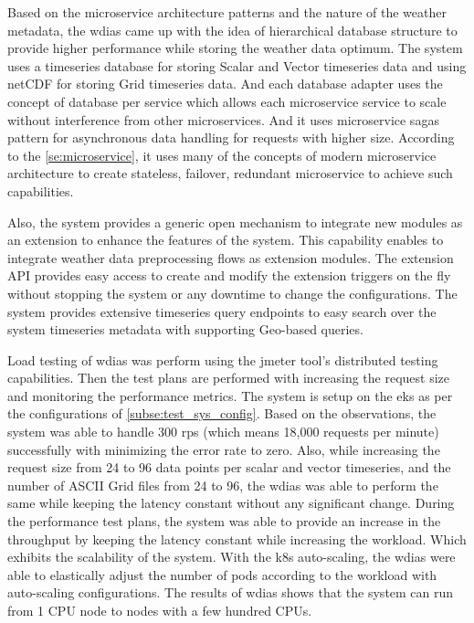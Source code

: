 Based on the microservice architecture patterns and the nature of the weather metadata, the \acrshort{wdias} came up with the idea of hierarchical database structure to provide higher performance while storing the weather data optimum. The system uses a timeseries database for storing Scalar and Vector timeseries data and using \acrshort{netCDF} for storing Grid timeseries data. And each database adapter uses the concept of database per service which allows each microservice service to scale without interference from other microservices.
And it uses microservice sagas pattern for asynchronous data handling for requests with higher size. According to the \cref{se:microservice}, it uses many of the concepts of modern microservice architecture to create stateless, failover, redundant microservice to achieve such capabilities.

Also, the system provides a generic open mechanism to integrate new modules as an extension to enhance the features of the system. This capability enables to integrate weather data preprocessing flows as extension modules.
The extension API provides easy access to create and modify the extension triggers on the fly without stopping the system or any downtime to change the configurations.
The system provides extensive timeseries query endpoints to easy search over the system timeseries metadata with supporting Geo-based queries.

Load testing of \acrshort{wdias} was perform using the \acrshort{jmeter} tool's distributed testing capabilities. Then the test plans are performed with increasing the request size and monitoring the performance metrics. The system is setup on the \acrfull{eks} as per the configurations of \cref{subse:test_sys_config}. Based on the observations, the system was able to handle 300 \acrshort{rps} (which means 18,000 requests per minute) successfully with minimizing the error rate to zero. Also, while increasing the request size from 24 to 96 data points per scalar and vector timeseries, and the number of ASCII Grid files from 24 to 96, the \acrshort{wdias} was able to perform the same while keeping the latency constant without any significant change. During the performance test plans, the system was able to provide an increase in the throughput by keeping the latency constant while increasing the workload. Which exhibits the scalability of the system.
With the \acrshort{k8s} auto-scaling, the \acrshort{wdias} were able to elastically adjust the number of pods according to the workload with auto-scaling configurations. 
The results of \acrshort{wdias} shows that the system can run from 1 CPU node to nodes with a few hundred CPUs.